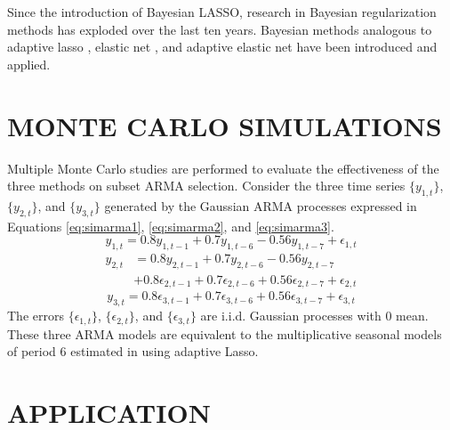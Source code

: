 Since the introduction of Bayesian LASSO, research in Bayesian regularization methods has exploded over the last ten years. Bayesian methods analogous to adaptive lasso \citep{Leng2014}, elastic net \citep{Li2010a}, and adaptive elastic net \citep{Stankiewicz2015} have been introduced and applied. \cite{Polson2010}





\section{MONTE CARLO SIMULATIONS}
Multiple Monte Carlo studies are performed to evaluate the effectiveness of the three methods on subset ARMA selection. Consider the three time series $\{y_{1,t}\}$, $\{y_{2,t}\}$, and $\{y_{3,t}\}$ generated by the Gaussian ARMA processes expressed in Equations \ref{eq:simarma1}, \ref{eq:simarma2}, and \ref{eq:simarma3}.
\begin{equation}
	\label{eq:simarma1}
	y_{1,t}=0.8y_{1,t-1}+0.7y_{1,t-6}-0.56y_{1,t-7}+\epsilon_{1,t}
\end{equation}
\begin{equation}
	\begin{split}
	\label{eq:simarma2}
	y_{2,t}&=0.8y_{2,t-1}+0.7y_{2,t-6}-0.56y_{2,t-7}\\
	&+0.8\epsilon_{2,t-1}+0.7\epsilon_{2,t-6}+0.56\epsilon_{2,t-7}+\epsilon_{2,t}
	\end{split}
\end{equation}
\begin{equation}
	\label{eq:simarma3}
	y_{3,t}=0.8\epsilon_{3,t-1}+0.7\epsilon_{3,t-6}+0.56\epsilon_{3,t-7}+\epsilon_{3,t}
\end{equation}
The errors $\{\epsilon_{1,t}\}$, $\{\epsilon_{2,t}\}$, and $\{\epsilon_{3,t}\}$ are i.i.d. Gaussian processes with $0$ mean. These three ARMA models are equivalent to the multiplicative seasonal models of period 6 estimated in \cite{Chen2011} using adaptive Lasso. 









\section{APPLICATION}


